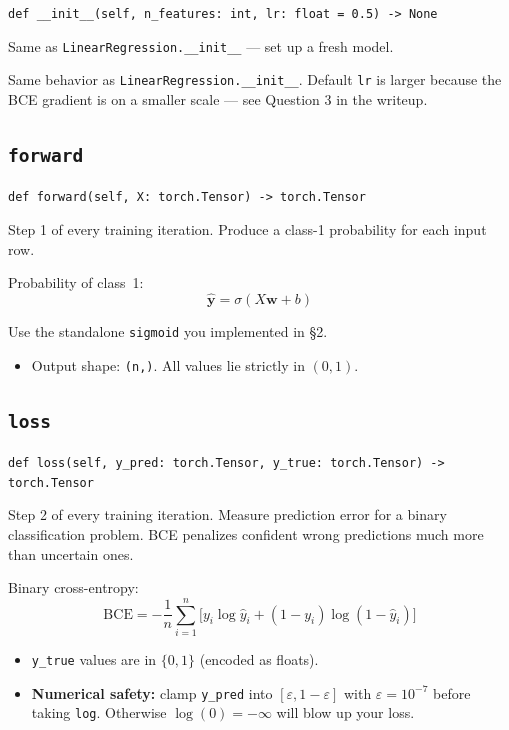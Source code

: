 \documentclass[11pt]{article}
\newcommand{\code}[1]{\texttt{\small #1}}
\newcommand{\vw}{\mathbf{w}}
\newcommand{\vyhat}{\hat{\mathbf{y}}}
\begin{document}
\noindent
\code{def \_\_init\_\_(self, n\_features: int, lr: float = 0.5) -> None}

\medskip\noindent
Same as \code{LinearRegression.\_\_init\_\_} --- set up a fresh model.

\medskip\noindent
Same behavior as \code{LinearRegression.\_\_init\_\_}. Default \code{lr} is
larger because the BCE gradient is on a smaller scale --- see Question 3 in
the writeup.

\subsection{\texttt{forward}}

\noindent
\code{def forward(self, X: torch.Tensor) -> torch.Tensor}

\medskip\noindent
Step 1 of every training iteration. Produce a class-1
probability for each input row.

\medskip\noindent
Probability of class~1:
\[
    \vyhat = \sigma(X \vw + b)
\]

Use the standalone \code{sigmoid} you implemented in §2.

\begin{itemize}
    \item Output shape: \code{(n,)}. All values lie strictly in $(0, 1)$.
\end{itemize}

\subsection{\texttt{loss}}

\noindent
\code{def loss(self, y\_pred: torch.Tensor, y\_true: torch.Tensor) -> torch.Tensor}

\medskip\noindent
Step 2 of every training iteration. Measure prediction error for
a binary classification problem. BCE penalizes confident wrong predictions
much more than uncertain ones.

\medskip\noindent
Binary cross-entropy:
\[
    \mathrm{BCE}
    = -\frac{1}{n} \sum_{i=1}^{n}
        \big[
            y_i \log \hat{y}_i + (1 - y_i) \log (1 - \hat{y}_i)
        \big]
\]

\begin{itemize}
    \item \code{y\_true} values are in $\{0, 1\}$ (encoded as floats).
    \item \textbf{Numerical safety:} clamp \code{y\_pred} into
          $[\varepsilon, 1 - \varepsilon]$ with $\varepsilon = 10^{-7}$ before
          taking \code{log}. Otherwise $\log(0) = -\infty$ will blow up your loss.
\end{itemize}
\end{document}
